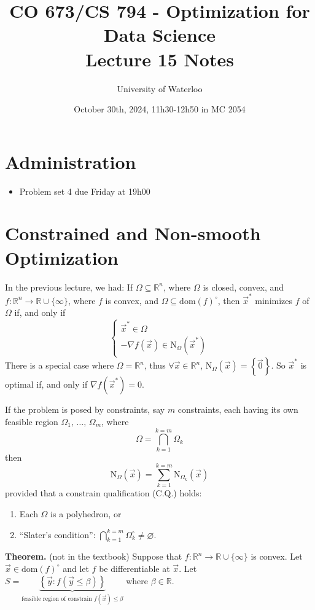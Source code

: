 \documentclass{article}
\title{CO 673/CS 794 - Optimization for Data Science\\Lecture 15 Notes}
\author{University of Waterloo}
\date{October 30th, 2024, 11h30-12h50 in MC 2054}
\newcommand{\R}{\mathbb{R}}
\newcommand{\dom}{\text{dom}}
\begin{document}
\maketitle

\section{Administration}

\begin{itemize}
    \item Problem set 4 due Friday at 19h00
\end{itemize}

\section{Constrained and Non-smooth Optimization}

In the previous lecture, we had: If $\Omega \subseteq \R^n$, where $\Omega$ is closed, convex, and $f \colon \R^n \to \R \cup \{\infty\}$, where $f$ is convex, and $\Omega \subseteq \dom(f)^\circ$, then $\vec{x}^*$ minimizes $f$ of $\Omega$ if, and only if
\[
    \begin{cases}
        \vec{x}^* \in \Omega \\
        -\nabla f(\vec{x}) \in \text{N}_{\Omega}(\vec{x}^*)
    \end{cases}
\]
There is a special case where $\Omega = \R^n$, thus $\forall \vec{x} \in \R^n$, $\text{N}_{\Omega}(\vec{x}) = \left\{\vec{0}\right\}$. So $\vec{x}^*$ is optimal if, and only if $\nabla f(\vec{x}^*) = 0$.

If the problem is posed by constraints, say $m$ constraints, each having its own feasible region $\Omega_1,\, \ldots,\, \Omega_m$, where
\[
    \Omega = \bigcap_{k = 1}^{k = m} \Omega_k
\]
then
\[
    \text{N}_{\Omega}(\vec{x}) = \sum_{k = 1}^{k = m} \text{N}_{\Omega_k}(\vec{x})
\]
provided that a constrain qualification (C.Q.) holds:
\begin{enumerate}
    \item Each $\Omega$ is a polyhedron, or
    \item ``Slater's condition'': $\bigcap_{k = 1}^{k = m} \Omega_k^\circ \neq \varnothing$.
\end{enumerate}

\textbf{Theorem.} (not in the textbook) Suppose that $f\colon \R^n \to \R \cup \{\infty\}$ is convex. Let $\vec{x} \in \dom(f)^\circ$ and let $f$ be differentiable at $\vec{x}$. Let $S = \underbrace{\left\{\vec{y} : f(\vec{y} \leq \beta)\right\}}_{\text{feasible region of constrain $f(\vec{x}) \leq \beta$}}$ where $\beta \in \R$.
\end{document}
